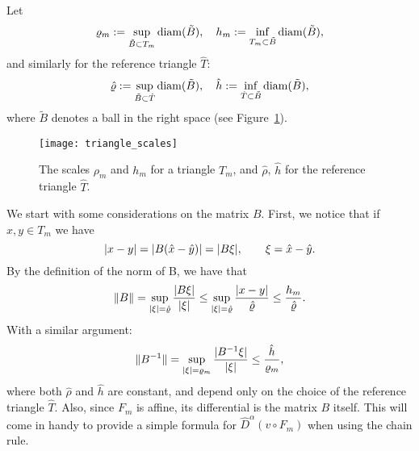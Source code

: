 Let
\[
\varrho_m := \sup_{\tilde{B} \subset T_m} \operatorname{diam}(\tilde{B}), \quad h_m := \inf_{T_m \subset \tilde{B}} \operatorname{diam}(\tilde{B}),
\]
and similarly for the reference triangle $\hat{T}$:
\[
\hat{\varrho} := \sup_{\tilde{B} \subset \hat{T}} \operatorname{diam}(\tilde{B}), \quad \hat{h} := \inf_{\hat{T} \subset \tilde{B}} \operatorname{diam}(\tilde{B}),
\]
where $\tilde{B}$ denotes a ball in the right space (see Figure~\ref{fig:scaling}).


\begin{figure}[!ht]
\centering
\texttt{[image: triangle\_scales]}
\caption{The scales $\rho_m$ and $h_m$ for a triangle $T_m$, and $\hat \rho$, $\hat h$ for the reference triangle $\hat T$.}
\label{fig:scaling}
\end{figure}


We start with some considerations on the matrix $B$. First, we notice that if $x,y \in T_m$ we have
\[
\lvert x-y\rvert = \lvert B(\hat{x}-\hat{y})\rvert = \lvert B \xi\rvert, \qquad \xi = \hat{x}-\hat{y}.
\]
By the definition of the norm of B, we have that
\begin{equation}
\lVert B\rVert = \sup_{\lvert\xi\rvert = \hat{\varrho}} \frac{\lvert B \xi\rvert}{\lvert\xi\rvert} \le
\sup_{\lvert\xi\rvert = \hat{\varrho}} \frac{\lvert x-y\rvert}{\hat{\varrho}} \le \frac{h_m}{\hat{\varrho}}.
\label{eqn:scaling_B}
\end{equation}
With a similar argument:
\begin{equation}
  \lVert B^{-1}\rVert = \sup_{\lvert\xi\rvert = \varrho_m} \frac{\lvert B^{-1} \xi\rvert}{\lvert\xi\rvert} \le \frac{\hat{h}}{\varrho_m},
  \label{eqn:scaling_B_inv}
\end{equation}
where both $\hat \rho$ and $\hat h$ are constant, and depend only on the choice of the reference triangle $\hat T$.
Also, since $F_m$ is affine, its differential is the matrix $B$ itself. This will come in handy to provide a simple formula for $\hat{D}^\alpha (v \circ F_m)$ when using the chain rule.


